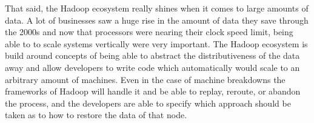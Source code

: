 That said, the Hadoop ecosystem really shines when it comes to large amounts of data. A lot of businesses saw a huge rise in the amount of data they save through the 2000s and now that processors were nearing their clock speed limit, being able to to scale systems vertically were very important. The Hadoop ecosystem is build around concepts of being able to abstract the distributiveness of the data away and allow developers to write code which automatically would scale to an arbitrary amount of machines. Even in the case of machine breakdowns the frameworks of Hadoop will handle it and be able to replay, reroute, or abandon the process, and the developers are able to specify which approach should be taken as to how to restore the data of that node.
